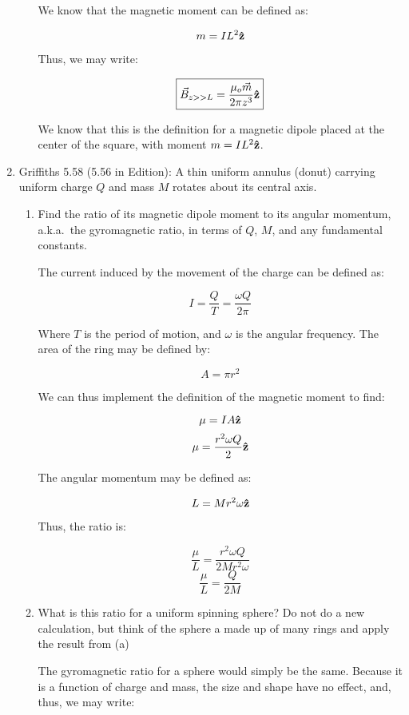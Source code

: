 \begin{enumerate}
\begin{enumerate}
        We know that the magnetic moment can be defined as:

        $$m=IL^2\bold{\hat{z}}$$

        Thus, we may write:

        $$\boxed{\vec{B}_{z>>L}=\frac{\mu_o\vec{m}}{2\pi z^3}\bold{\hat{z}}}$$

        We know that this is the definition for a magnetic dipole placed at the center of the square, with moment $m=IL^2\bold{\hat{z}}$.

    \end{enumerate}

  \item Griffiths 5.58 (5.56 in  Edition): A thin uniform annulus (donut) carrying uniform charge $Q$ and mass $M$ rotates about its central axis.

    \begin{enumerate}

      \item Find the ratio of its magnetic dipole moment to its angular momentum, a.k.a.\ the gyromagnetic ratio, in terms of $Q$, $M$, and any fundamental constants.

        The current induced by the movement of the charge can be defined as:

        $$I=\frac{Q}{T}=\frac{\omega Q}{2\pi}$$

        Where $T$ is the period of motion, and $\omega$ is the angular frequency. The area of the ring may be defined by:

        $$A=\pi r^2$$

        We can thus implement the definition of the magnetic moment to find:

        $$\mu=IA\bold{\hat{z}}$$
        $$\mu=\frac{r^2\omega Q}{2}\bold{\hat{z}}$$

        The angular momentum may be defined as:

        $$L=Mr^2\omega\bold{\hat{z}}$$

        Thus, the ratio is:

        $$\frac{\mu}{L}=\frac{r^2\omega Q}{2Mr^2\omega}$$
        $$\boxed{\frac{\mu}{L}=\frac{Q}{2M}}$$

      \item What is this ratio for a uniform spinning sphere?  Do not do a new calculation, but think of the sphere a made up of many rings and apply the result from (a)

        The gyromagnetic ratio for a sphere would simply be the same. Because it is a function of charge and mass, the size and shape have no effect, and, thus, we may write:


\end{enumerate}
\end{enumerate}
